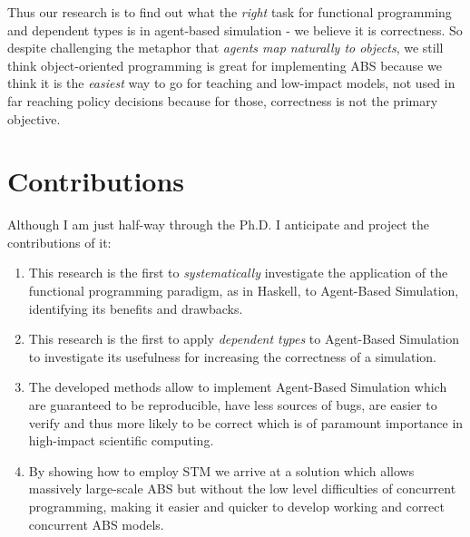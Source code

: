 Thus our research is to find out what the \textit{right} task for functional programming and dependent types is in agent-based simulation - we believe it is correctness. So despite challenging the metaphor that \textit{agents map naturally to objects}, we still think object-oriented programming is great for implementing ABS because we think it is the \textit{easiest} way to go for teaching and low-impact models, not used in far reaching policy decisions because for those, correctness is not the primary objective.

\section{Contributions}
\label{sect:contrib}
Although I am just half-way through the Ph.D. I anticipate and project the contributions of it:

\begin{enumerate}
	\item This research is the first to \textit{systematically} investigate the application of the functional programming paradigm, as in Haskell, to Agent-Based Simulation, identifying its benefits and drawbacks.
	\item This research is the first to apply \textit{dependent types} to Agent-Based Simulation to investigate its usefulness for increasing the correctness of a simulation.
	\item The developed methods allow to implement Agent-Based Simulation which are guaranteed to be reproducible, have less sources of bugs, are easier to verify and thus more likely to be correct which is of paramount importance in high-impact scientific computing. 
	\item By showing how to employ STM we arrive at a solution which allows massively large-scale ABS but without the low level difficulties of concurrent programming, making it easier and quicker to develop working and correct concurrent ABS models.
\end{enumerate}